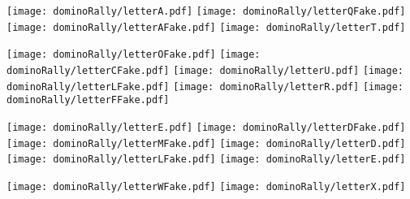 \begin{puzzle}
\begin{center}
  \texttt{[image: dominoRally/letterA.pdf]}\hspace{0.03\linewidth}
  \texttt{[image: dominoRally/letterQFake.pdf]}\hspace{0.03\linewidth}
  \texttt{[image: dominoRally/letterAFake.pdf]}\hspace{0.03\linewidth}
  \texttt{[image: dominoRally/letterT.pdf]}\hspace{0.03\linewidth}
\end{center}
\begin{center}
  \texttt{[image: dominoRally/letterOFake.pdf]}\hspace{0.03\linewidth}
  \texttt{[image: dominoRally/letterCFake.pdf]}\hspace{0.03\linewidth}
  \texttt{[image: dominoRally/letterU.pdf]}\hspace{0.03\linewidth}
  \texttt{[image: dominoRally/letterLFake.pdf]}\hspace{0.03\linewidth}
  \texttt{[image: dominoRally/letterR.pdf]}\hspace{0.03\linewidth}
  \texttt{[image: dominoRally/letterFFake.pdf]}\hspace{0.03\linewidth}
\end{center}
\begin{center}
  \texttt{[image: dominoRally/letterE.pdf]}\hspace{0.03\linewidth}
  \texttt{[image: dominoRally/letterDFake.pdf]}\hspace{0.03\linewidth}
  \texttt{[image: dominoRally/letterMFake.pdf]}\hspace{0.03\linewidth}
  \texttt{[image: dominoRally/letterD.pdf]}\hspace{0.03\linewidth}
  \texttt{[image: dominoRally/letterLFake.pdf]}\hspace{0.03\linewidth}
  \texttt{[image: dominoRally/letterE.pdf]}\hspace{0.03\linewidth}
\end{center}
\begin{center}
  \texttt{[image: dominoRally/letterWFake.pdf]}\hspace{0.03\linewidth}
  \texttt{[image: dominoRally/letterX.pdf]}\hspace{0.03\linewidth}

\end{center}
\end{puzzle}
